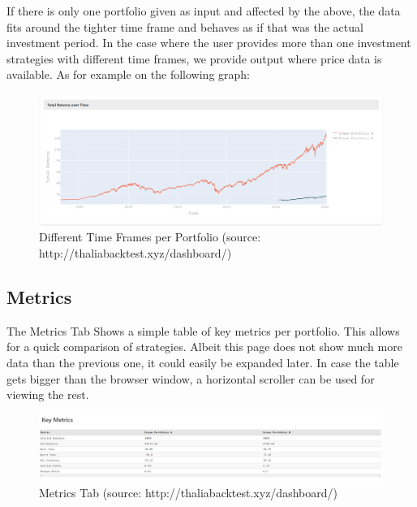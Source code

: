 \documentclass[main.tex]{subfiles}
\begin{document}
If there is only one portfolio given as input and affected by the above, the data fits around the tighter time frame and behaves as if that was the actual investment period. In the case where the user provides more than one investment strategies with different time frames, we provide output where price data is available. As for example on the following graph:



\begin{figure}[H]

   \centering

   \includegraphics[width=\textwidth]{08Appendices/081User/081Pictures/differences.png}

   \caption{Different Time Frames per Portfolio (source: http://thaliabacktest.xyz/dashboard/)}

\end{figure}



\subsection*{Metrics}



The Metrics Tab Shows a simple table of key metrics per portfolio. This allows for a quick comparison of strategies. Albeit this page does not show much more data than the previous one, it could easily be expanded later. In case the table gets bigger than the browser window, a horizontal scroller can be used for viewing the rest. 



\begin{figure}[H]

   \centering

   \includegraphics[width=\textwidth]{08Appendices/081User/081Pictures/metrics.png}

   \caption{Metrics Tab (source: http://thaliabacktest.xyz/dashboard/)}

   \label{metrics}

\end{figure}
\end{document}
